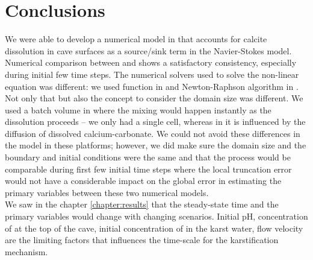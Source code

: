 \chapter{Conclusions} \label{chapter:conclusions}
\thispagestyle{empty}
We were able to develop a numerical model in \DuMuX that accounts for calcite dissolution 
in cave surfaces as a source/sink term in the Navier-Stokes model. \\


Numerical comparison between \DuMuX and \MATLAB shows a satisfactory consistency, especially
during initial few time steps. The numerical solvers used to solve the non-linear equation was
different: we used  function in \MATLAB and Newton-Raphson algorithm in \DuMuX. 
Not only that but also the concept to consider the domain size was different. We used a batch 
volume in \MATLAB where the mixing would happen instantly as the dissolution proceeds -- we only 
had a single cell, whereas in \DuMuX it is influenced by the diffusion of dissolved calcium-carbonate. 
We could not avoid these differences in the model in these platforms; however, we did make sure the 
domain size and the boundary and initial conditions were the same and that the process would be comparable 
during first few initial time steps where the local truncation error would not have a considerable impact on 
the global error in estimating the primary variables between these two numerical models.\\

We saw in the chapter \ref{chapter:results} that the steady-state time and the primary variables would 
change with changing scenarios. Initial pH, concentration of  at the top of the cave, initial 
concentration of  in the karst water, flow velocity are the limiting factors that influences the 
time-scale for the karstification mechanism.\\

